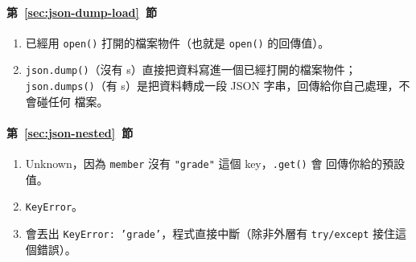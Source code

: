 \paragraph{第~\ref{sec:json-dump-load}~節}
\begin{enumerate}
\item 已經用 \texttt{open()} 打開的檔案物件（也就是 \texttt{open()} 的回傳值）。
\item \texttt{json.dump()}（沒有 s）直接把資料寫進一個已經打開的檔案物件；
\texttt{json.dumps()}（有 s）是把資料轉成一段 JSON 字串，回傳給你自己處理，不會碰任何
檔案。
\end{enumerate}

\paragraph{第~\ref{sec:json-nested}~節}
\begin{enumerate}
\item Unknown，因為 \texttt{member} 沒有 \texttt{"grade"} 這個 key，\texttt{.get()} 會
回傳你給的預設值。
\item \texttt{KeyError}。
\item 會丟出 \texttt{KeyError: 'grade'}，程式直接中斷（除非外層有 \texttt{try/except}
接住這個錯誤）。
\end{enumerate}
